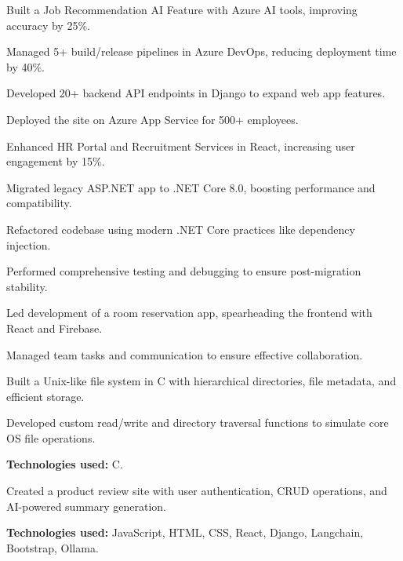 \documentclass{resume}
\begin{document}
\begin{resume}
	\begin{experiences}
		{
			\item Built a Job Recommendation AI Feature with Azure AI tools, improving accuracy by 25\%.
			\item Managed 5+ build/release pipelines in Azure DevOps, reducing deployment time by 40\%.
			\item Developed 20+ backend API endpoints in Django to expand web app features.
			\item Deployed the site on Azure App Service for 500+ employees.
			\item Enhanced HR Portal and Recruitment Services in React, increasing user engagement by 15\%.
		}
		{
			\item Migrated legacy ASP.NET app to .NET Core 8.0, boosting performance and compatibility.
			\item Refactored codebase using modern .NET Core practices like dependency injection.
			\item Performed comprehensive testing and debugging to ensure post-migration stability.
		}
		{
			\item Led development of a room reservation app, spearheading the frontend with React and Firebase.
			\item Managed team tasks and communication to ensure effective collaboration.
		}
	\end{experiences}

	\begin{projects}
		{ \item Built a Unix-like file system in C with hierarchical directories, file metadata, and efficient storage.
			\item Developed custom read/write and directory traversal functions to simulate core OS file operations.
			\item \textbf{Technologies used:} C.
		}
		{
			\item Created a product review site with user authentication, CRUD operations, and AI-powered summary generation.
			\item \textbf{Technologies used:} JavaScript, HTML, CSS, React, Django, Langchain, Bootstrap, Ollama.
		}
	\end{projects}

\end{resume}
\end{document}
